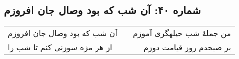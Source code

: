 \begin{center}
\section*{شماره ۴۰: آن شب که بود وصال جان افروزم}
\label{sec:040}
\begin{longtable}{l p{0.5cm} r}
آن شب که بود وصال جان افروزم
&&
من جملهٔ شب حیلهگری آموزم
\\
از هر مژه سوزنی کنم تا شب را
&&
بر صبحدم روز قیامت دوزم
\\
\end{longtable}
\end{center}
